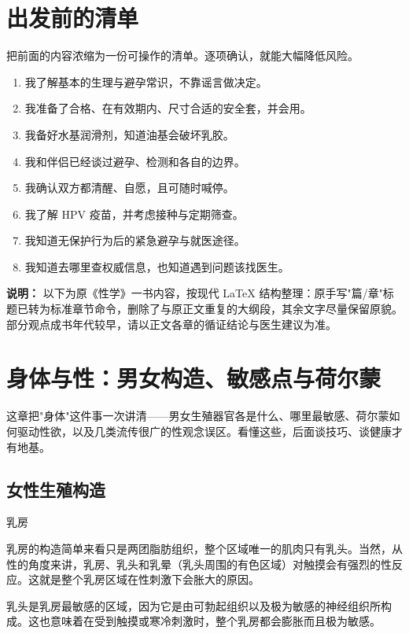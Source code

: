 \documentclass[12pt,UTF8,openany]{ctexbook}
\begin{document}
\chapter{出发前的清单}

把前面的内容浓缩为一份可操作的清单。逐项确认，就能大幅降低风险。

\begin{enumerate}[leftmargin=2em,itemsep=0.4em]
  \item 我了解基本的生理与避孕常识，不靠谣言做决定。
  \item 我准备了合格、在有效期内、尺寸合适的安全套，并会用。
  \item 我备好水基润滑剂，知道油基会破坏乳胶。
  \item 我和伴侣已经谈过避孕、检测和各自的边界。
  \item 我确认双方都清醒、自愿，且可随时喊停。
  \item 我了解 HPV 疫苗，并考虑接种与定期筛查。
  \item 我知道无保护行为后的紧急避孕与就医途径。
  \item 我知道去哪里查权威信息，也知道遇到问题该找医生。
\end{enumerate}

\noindent\textbf{说明：} 以下为原《性学》一书内容，按现代 LaTeX 结构整理：原手写"篇/章"标题已转为标准章节命令，删除了与原正文重复的大纲段，其余文字尽量保留原貌。部分观点成书年代较早，请以正文各章的循证结论与医生建议为准。

\chapter{身体与性：男女构造、敏感点与荷尔蒙}
\label{chap:body}

这章把"身体"这件事一次讲清——男女生殖器官各是什么、哪里最敏感、荷尔蒙如何驱动性欲，以及几类流传很广的性观念误区。看懂这些，后面谈技巧、谈健康才有地基。

\section{女性生殖构造}

乳房

乳房的构造简单来看只是两团脂肪组织，整个区域唯一的肌肉只有乳头。当然，从性的角度来讲，乳房、乳头和乳晕（乳头周围的有色区域）对触摸会有强烈的性反应。这就是整个乳房区域在性刺激下会胀大的原因。

乳头是乳房最敏感的区域，因为它是由可勃起组织以及极为敏感的神经组织所构成。这也意味着在受到触摸或寒冷刺激时，整个乳房都会膨胀而且极为敏感。
\end{document}
